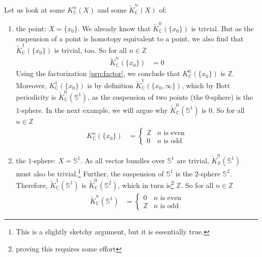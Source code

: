\begin{exa}
\label{exa:kgrstandard}
Let us look at some $K_{\mathbb{C}}^{n}(X)$ and some $\tilde{K}_{\mathbb{C}}^{n}(X)$ of:
\begin{enumerate}
\item
the point: $X = \lbrace x_{0} \rbrace$.
We already know that $\tilde{K}_{\mathbb{C}}^{0}(\lbrace x_{0} \rbrace)$ is trivial.
But as the suspension of a point is homotopy equivalent to a point, we also find that $\tilde{K}_{\mathbb{C}}^{1}(\lbrace x_{0} \rbrace)$ is trivial, too.
So for all $n \in \mathbb{Z}$
\begin{align*}
  \tilde{K}_{\mathbb{C}}^{n}(\lbrace x_{0} \rbrace)
  &=
  0
\end{align*}
    Using the factorization \ref{prp:factor}, we conclude that $K_{\mathbb{C}}^{0}(\lbrace x_{0} \rbrace)$ is $\mathbb{Z}$.
Moreover, $K_{\mathbb{C}}^{1}(\lbrace x_{0} \rbrace)$ is by definition $\tilde{K}_{\mathbb{C}}^{1}(\lbrace x_{0}, \infty  \rbrace)$, which by Bott periodicity is $\tilde{K}_{\mathbb{C}}^{0}(\mathbb{S}^{1})$, as the suspension of two points (the $0$-sphere) is the $1$-sphere.
In the next example, we will argue why $\tilde{K}_{\mathbb{C}}^{0}(\mathbb{S}^{1})$ is $0$.
So for all $n \in \mathbb{Z}$
\begin{align*}
  K_{\mathbb{C}}^{n}(\lbrace x_{0} \rbrace)
  &=
  \begin{cases}
    \mathbb{Z}
    &
    \text{$n$ is even}
    \\
    0
    &
    \text{$n$ is odd}
  \end{cases}
\end{align*}
\item
  the $1$-sphere: $X = \mathbb{S}^{1}$.
As all vector bundles over $\mathbb{S}^{1}$ are trivial, $\tilde{K}_{\mathbb{X}}^{0}(\mathbb{S}^{1})$ must also be trivial.\footnote{This is a slightly sketchy argument, but it is essentially true.} Further, the suspension of $\mathbb{S}^{1}$ is the $2$-sphere $\mathbb{S}^{2}$.
Therefore, $\tilde{K}_{\mathbb{C}}^{1}(\mathbb{S}^{1})$ is $\tilde{K}_{\mathbb{C}}^{0}(\mathbb{S}^{2})$, which in turn is\footnote{proving this requires some effort} $\mathbb{Z}$.
So for all $n \in \mathbb{Z}$
\begin{align*}
  \tilde{K}_{\mathbb{C}}^{n}(\mathbb{S}^{1})
  &=
  \begin{cases}
    0
    &
    \text{$n$ is even}
    \\
    \mathbb{Z}
    &
    \text{$n$ is odd}
  \end{cases}
\end{align*}

\end{enumerate}
\end{exa}
